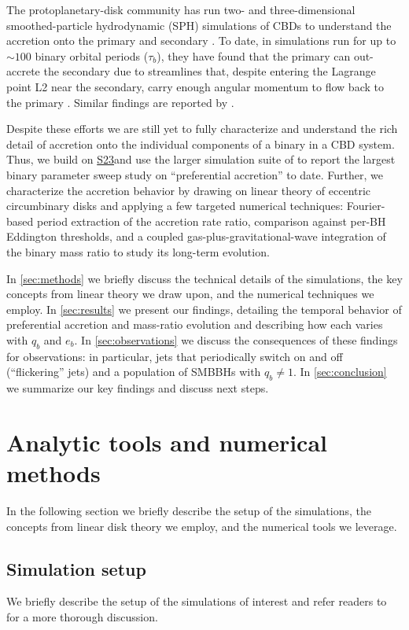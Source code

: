 \documentclass[fleqn,usenatbib]{mnras}
\newcommand{\Stwentythree}{\href{https://doi.org/10.1093/mnras/stac3263}{S23}}
\begin{document}
The protoplanetary-disk community has run two- and three-dimensional smoothed-particle hydrodynamic (SPH) simulations of CBDs to understand the accretion onto the primary and secondary \citep{Gunther_Kley_02, Ochi_05, Young_15}. To date, in simulations run for up to $\sim 100$ binary orbital periods ($\tau_b$), they have found that the primary can out-accrete the secondary due to streamlines that, despite entering the Lagrange point L2 near the secondary, carry enough angular momentum to flow back to the primary \citep{Ochi_05, Young_15}. Similar findings are reported by \citet{Tiede_22}.

Despite these efforts we are still yet to fully characterize and understand the rich detail of accretion onto the individual components of a binary in a CBD system. Thus, we build on \Stwentythree and use the larger simulation suite of \citealt{siwek_cbdorbevol} to report the largest binary parameter sweep study on ``preferential accretion'' to date. Further, we characterize the accretion behavior by drawing on linear theory of eccentric circumbinary disks and applying a few targeted numerical techniques: Fourier-based period extraction of the accretion rate ratio, comparison against per-BH Eddington thresholds, and a coupled gas-plus-gravitational-wave integration of the binary mass ratio to study its long-term evolution.

In \autoref{sec:methods} we briefly discuss the technical details of the simulations, the key concepts from linear theory we draw upon, and the numerical techniques we employ. In \autoref{sec:results} we present our findings, detailing the temporal behavior of preferential accretion and mass-ratio evolution and describing how each varies with $q_b$ and $e_b$. In \autoref{sec:observations} we discuss the consequences of these findings for observations: in particular, jets that periodically switch on and off (``flickering'' jets) and a population of SMBBHs with $q_b \neq 1$. In \autoref{sec:conclusion} we summarize our key findings and discuss next steps.


\section{Analytic tools and numerical methods}\label{sec:methods}
In the following section we briefly describe the setup of the \citet{siwek_prefacc, siwek_cbdorbevol} simulations, the concepts from linear disk theory we employ, and the numerical tools we leverage.
\subsection{Simulation setup}
We briefly describe the setup of the simulations of interest and refer readers to \citet{siwek_prefacc, siwek_cbdorbevol} for a more thorough discussion.
\end{document}

